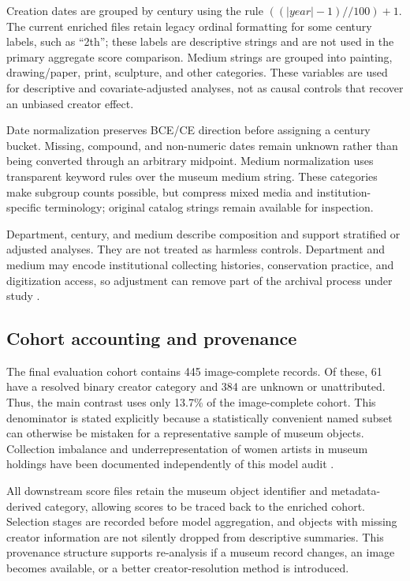 \documentclass[pdflatex,sn-basic,Numbered]{sn-jnl}
\begin{document}
Creation dates are grouped by century using the rule $((|year|-1)//100)+1$. The current enriched files retain legacy ordinal formatting for some century labels, such as ``2th''; these labels are descriptive strings and are not used in the primary aggregate score comparison. Medium strings are grouped into painting, drawing/paper, print, sculpture, and other categories. These variables are used for descriptive and covariate-adjusted analyses, not as causal controls that recover an unbiased creator effect.

Date normalization preserves BCE/CE direction before assigning a century bucket. Missing, compound, and non-numeric dates remain unknown rather than being converted through an arbitrary midpoint. Medium normalization uses transparent keyword rules over the museum medium string. These categories make subgroup counts possible, but compress mixed media and institution-specific terminology; original catalog strings remain available for inspection.

Department, century, and medium describe composition and support stratified or adjusted analyses. They are not treated as harmless controls. Department and medium may encode institutional collecting histories, conservation practice, and digitization access, so adjustment can remove part of the archival process under study \cite{bowker2000sorting, caswell2016archival}.

\subsection{Cohort accounting and provenance}

The final evaluation cohort contains 445 image-complete records. Of these, 61 have a resolved binary creator category and 384 are unknown or unattributed. Thus, the main contrast uses only 13.7\% of the image-complete cohort. This denominator is stated explicitly because a statistically convenient named subset can otherwise be mistaken for a representative sample of museum objects. Collection imbalance and underrepresentation of women artists in museum holdings have been documented independently of this model audit \cite{topaz2019diversity, meier2021gender}.

All downstream score files retain the museum object identifier and metadata-derived category, allowing scores to be traced back to the enriched cohort. Selection stages are recorded before model aggregation, and objects with missing creator information are not silently dropped from descriptive summaries. This provenance structure supports re-analysis if a museum record changes, an image becomes available, or a better creator-resolution method is introduced.
\end{document}
